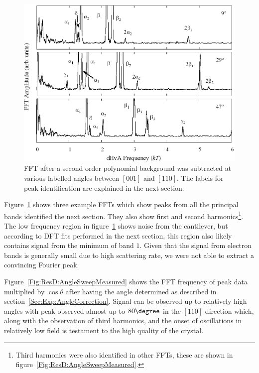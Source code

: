 \begin{figure}[htbp]
    \begin{center}
        \includegraphics[scale=0.7]{Chapter-dHvABaFe2P2/Figures/AngleDepMeasurements/FFTExamples/FFTExamples}
        \caption{\ac{FFT} after a second order polynomial background was subtracted at various labelled angles between $[001]$ and $[110]$. The labels for peak identification are explained in the next section.}
        \label{Fig:ResD:FFTExamples}
    \end{center}
\end{figure}

Figure~\ref{Fig:ResD:FFTExamples} shows three example \acp{FFT} which show peaks from all the principal bands identified the next section. They also show first and second harmonics\footnote{Third harmonics were also identified in other \acp{FFT}, these are shown in figure~\ref{Fig:ResD:AngleSweepMeasured}.}. The low frequency region in figure~\ref{Fig:ResD:FFTExamples} shows noise from the cantilever, but according to \ac{DFT} fits performed in the next section, this region also likely contains signal from the minimum of band $1$. Given that the signal from electron bands is generally small due to high scattering rate, we were not able to extract a convincing Fourier peak.

Figure~\ref{Fig:ResD:AngleSweepMeasured} shows the \ac{FFT} frequency of peak data multiplied by $\cos\theta$ after having the angle determined as described in section~\ref{Sec:Exp:AngleCorrection}.  Signal can be observed up to relatively high angles with peak observed almost up to $80\degree$ in the $[110]$ direction which, along with the observation of third harmonics, and the onset of oscillations in relatively low field is testament to the high quality of the crystal.

